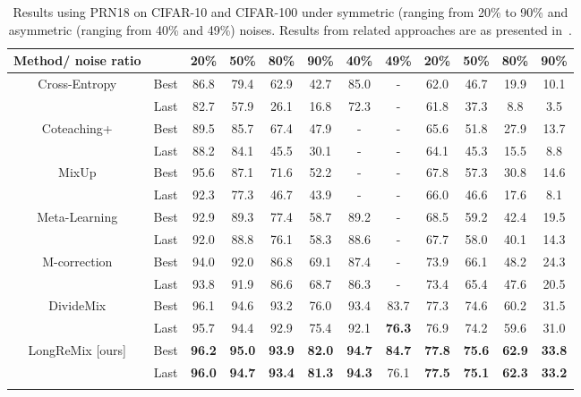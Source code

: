 \documentclass{article}
\begin{document}
\begin{table*}[ht]
{\begin{tabular}{cc|cccc|cc||cccc}
Method/ noise ratio & &  20\% & 50\% & 80\% & 90\% & 40\%& 49\% & 20\% & 50\% & 80\% & 90\% \\
\midrule
\multirow{2}{*}{Cross-Entropy \cite{li2020dividemix}}& Best & 86.8 & 79.4 & 62.9 & 42.7 & 85.0 & - & 62.0 & 46.7 & 19.9 & 10.1\\
    & Last & 82.7 & 57.9 & 26.1 & 16.8 & 72.3 & - & 61.8 & 37.3 & 8.8 & 3.5\\
\midrule
\multirow{2}{*}{Coteaching+ \cite{yu2019does}} & Best & 89.5 & 85.7 & 67.4& 47.9& - & -&65.6& 51.8 & 27.9 & 13.7\\
    & Last & 88.2 & 84.1 & 45.5& 30.1& - & -&64.1& 45.3 & 15.5 & 8.8\\
\midrule
\multirow{2}{*}{MixUp \cite{zhang2017mixup}} &Best & 95.6 & 87.1 & 71.6& 52.2& - & - & 67.8& 57.3 & 30.8 & 14.6\\
 &Last & 92.3 & 77.3 & 46.7& 43.9& - & - & 66.0& 46.6 & 17.6 & 8.1\\
\midrule
\multirow{2}{*}{Meta-Learning \cite{li2019learning}}&Best & 92.9 & 89.3 & 77.4& 58.7& 89.2 & - & 68.5& 59.2 & 42.4 & 19.5 \\
   &Last & 92.0 & 88.8 & 76.1& 58.3& 88.6 & - & 67.7& 58.0 & 40.1 & 14.3 \\
\midrule
\multirow{2}{*}{M-correction \cite{arazo2019unsupervised}}&Best& 94.0 & 92.0 & 86.8& 69.1& 87.4 & - & 73.9& 66.1 & 48.2 & 24.3 \\
   &Last& 93.8 & 91.9 & 86.6& 68.7& 86.3 & - & 73.4& 65.4 & 47.6 & 20.5 \\
\midrule
\multirow{2}{*}{DivideMix \cite{li2020dividemix}}& Best &96.1 & 94.6 & 93.2 & 76.0& 93.4 & 83.7 & 77.3 & 74.6 & 60.2 & 31.5 \\
  & Last & 95.7 & 94.4 & 92.9 & 75.4& 92.1 & \textbf{76.3} & 76.9 & 74.2 & 59.6 & 31.0 \\
\midrule
\multirow{2}{*}{LongReMix [ours] }& Best & \textbf{96.2} & \textbf{95.0} & \textbf{93.9} & \textbf{82.0} & \textbf{94.7} & \textbf{84.7} & \textbf{77.8} & \textbf{75.6} & \textbf{62.9} & \textbf{33.8}\\
    & Last & \textbf{96.0} & \textbf{94.7} & \textbf{93.4} & \textbf{81.3} & \textbf{94.3} & 76.1 & \textbf{77.5} & \textbf{75.1} & \textbf{62.3} & \textbf{33.2}\\
\bottomrule \\
\end{tabular}
}
\caption{Results using PRN18 on CIFAR-10 and CIFAR-100 under symmetric (ranging from 20\% to 90\% and asymmetric (ranging from 40\% and 49\%) noises. Results from related approaches are as presented in~\cite{li2020dividemix}.} 
\label{tab:results_cifar}
\end{table*}
\end{document}
